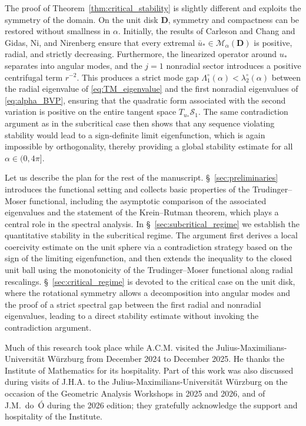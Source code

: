 \documentclass[reqno,11pt]{amsart}
\theoremstyle{definition}
\begin{document}
The proof of Theorem~\ref{thm:critical_stability} is slightly different and exploits the symmetry of the domain.
On the unit disk $\mathbf{D}$, symmetry and compactness can be restored without smallness in $\alpha$. 
Initially, the results of Carleson and Chang \cite{Carleson-Chang} and Gidas, Ni, and 
Nirenberg  \cite{MR634248} ensure that every extremal $\bar{u}_*\in\mathcal{M}_\alpha(\mathbf{D})$ 
is positive, radial, and strictly decreasing. 
Furthermore, the linearized operator around $u_*$ separates into angular modes, and the $j=1$ 
nonradial sector introduces a positive centrifugal term $r^{-2}$. 
This produces a strict mode gap $\Lambda_1^\circ(\alpha)<\lambda_2^\circ(\alpha)$ between the radial 
eigenvalue of \eqref{eq:TM_eigenvalue} and the first nonradial eigenvalues of \eqref{eq:alpha_BVP}, 
ensuring that the quadratic form associated with the second variation is positive on the entire 
tangent space $T_{u_*}\mathcal{S}_1$. 
The same contradiction argument as in the subcritical case then shows that any sequence violating 
stability would lead to a sign-definite limit eigenfunction, which is again impossible by orthogonality, 
thereby providing a global stability estimate for all $\alpha\in(0,4\pi]$.
\medskip 

Let us describe the plan for the rest of the manuscript.
\S~\ref{sec:preliminaries} introduces the functional setting and collects basic
properties of the Trudinger--Moser functional, including the asymptotic comparison of
the associated eigenvalues and the statement of the Krein--Rutman theorem, which plays
a central role in the spectral analysis.
In \S~\ref{sec:subcritical_regime} we establish the quantitative stability in the
subcritical regime. 
The argument first derives a local coercivity estimate on the unit sphere
via a contradiction strategy based on the sign of the limiting
eigenfunction, and then extends the inequality to the closed unit ball
using the monotonicity of the Trudinger--Moser functional
along radial rescalings.
\S~\ref{sec:critical_regime} is devoted to the critical case on the unit disk,
where the rotational symmetry allows a decomposition into angular modes and the proof
of a strict spectral gap between the first radial and nonradial eigenvalues, leading
to a direct stability estimate without invoking the contradiction argument.
\smallskip

 Much of this research took place while A.C.M. visited 
the Julius-Maximilians-Universit\"at W\"urzburg from December 2024 to December 2025. 
He thanks the Institute 
of Mathematics for its hospitality. Part of this work was also discussed during 
visits of J.H.A. to the Julius-Maximilians-Universit\"at W\"urzburg on the occasion of 
the Geometric Analysis Workshops in 2025 and 2026, and of J.M.~do~\'O during the 2026 
edition; they gratefully acknowledge the support and hospitality of the Institute.
\end{document}
